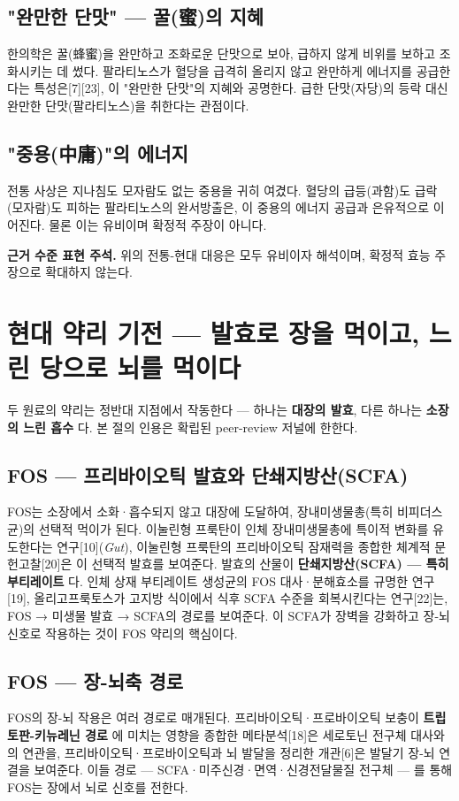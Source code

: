 \documentclass[11pt,oneside]{book}
\newenvironment{authnote}
  {\par\smallskip\begingroup\leftskip=7mm\rightskip=5mm\small\color{muted}\noindent\ignorespaces}
  {\par\endgroup\smallskip}
\begin{document}
\subsection{"완만한 단맛" — 꿀(蜜)의 지혜}
한의학은 꿀(蜂蜜)을 완만하고 조화로운 단맛으로 보아, 급하지 않게 비위를 보하고 조화시키는 데 썼다. 팔라티노스가 혈당을 급격히 올리지 않고 완만하게 에너지를 공급한다는 특성은[7][23], 이 "완만한 단맛"의 지혜와 공명한다. 급한 단맛(자당)의 등락 대신 완만한 단맛(팔라티노스)을 취한다는 관점이다.

\subsection{"중용(中庸)"의 에너지}
전통 사상은 지나침도 모자람도 없는 중용을 귀히 여겼다. 혈당의 급등(과함)도 급락(모자람)도 피하는 팔라티노스의 완서방출은, 이 중용의 에너지 공급과 은유적으로 이어진다. 물론 이는 유비이며 확정적 주장이 아니다.

\begin{authnote}\textbf{근거 수준 표현 주석.} 위의 전통-현대 대응은 모두 유비이자 해석이며, 확정적 효능 주장으로 확대하지 않는다.\end{authnote}
\section{현대 약리 기전 — 발효로 장을 먹이고, 느린 당으로 뇌를 먹이다}
두 원료의 약리는 정반대 지점에서 작동한다 — 하나는 \textbf{대장의 발효}, 다른 하나는 \textbf{소장의 느린 흡수} 다. 본 절의 인용은 확립된 peer-review 저널에 한한다.

\subsection{FOS — 프리바이오틱 발효와 단쇄지방산(SCFA)}
FOS는 소장에서 소화·흡수되지 않고 대장에 도달하여, 장내미생물총(특히 비피더스균)의 선택적 먹이가 된다. 이눌린형 프룩탄이 인체 장내미생물총에 특이적 변화를 유도한다는 연구[10](\textit{Gut}), 이눌린형 프룩탄의 프리바이오틱 잠재력을 종합한 체계적 문헌고찰[20]은 이 선택적 발효를 보여준다. 발효의 산물이 \textbf{단쇄지방산(SCFA) — 특히 부티레이트} 다. 인체 상재 부티레이트 생성균의 FOS 대사·분해효소를 규명한 연구[19], 올리고프룩토스가 고지방 식이에서 식후 SCFA 수준을 회복시킨다는 연구[22]는, FOS → 미생물 발효 → SCFA의 경로를 보여준다. 이 SCFA가 장벽을 강화하고 장-뇌 신호로 작용하는 것이 FOS 약리의 핵심이다.

\subsection{FOS — 장-뇌축 경로}
FOS의 장-뇌 작용은 여러 경로로 매개된다. 프리바이오틱·프로바이오틱 보충이 \textbf{트립토판-키뉴레닌 경로} 에 미치는 영향을 종합한 메타분석[18]은 세로토닌 전구체 대사와의 연관을, 프리바이오틱·프로바이오틱과 뇌 발달을 정리한 개관[6]은 발달기 장-뇌 연결을 보여준다. 이들 경로 — SCFA·미주신경·면역·신경전달물질 전구체 — 를 통해 FOS는 장에서 뇌로 신호를 전한다.
\end{document}
